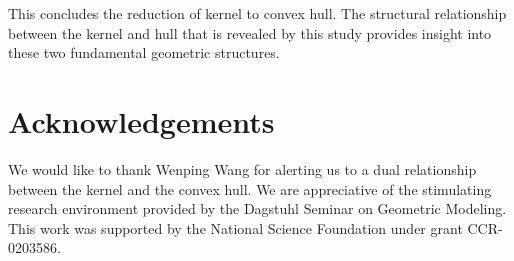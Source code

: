 \documentclass[doublespacing]{elsart}
\begin{document}
This concludes the reduction of kernel to convex hull.
The structural relationship between the kernel and hull that is revealed
by this study provides insight into these two fundamental geometric structures.

\section{Acknowledgements}

We would like to thank Wenping Wang for alerting us
to a dual relationship between the kernel and the convex hull.
We are appreciative of the stimulating research environment
provided by the Dagstuhl Seminar on Geometric Modeling.
This work was supported by the National Science Foundation under 
grant CCR-0203586.



\end{document}
